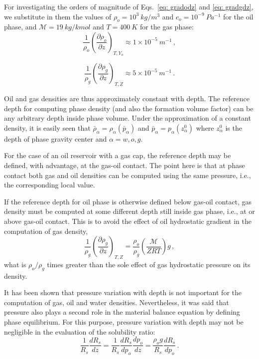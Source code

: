 \documentclass[authoryear,preprint,review,11pt]{elsarticle}
\begin{document}
For investigating the orders of magnitude of Eqs.~\eqref{eq: gradodz} and \eqref{eq: gradgdz}, we substitute in them the values of $\rho_o = 10^3\ kg/m^3$ and $c_o = 10^{-9}\ Pa^{-1}$ for the oil phase, and $\mathcal{M}=19\ kg/kmol$ and $T=400\ K$ for the gas phase: 
\begin{equation}
\frac{1}{\rho_o}\left(\frac{\partial \rho_o}{\partial z}\right)_{T,Y_o} \approx 1\times10^{-5}\ m^{-1} \, ,
\end{equation}

\begin{equation}
\frac{1}{\rho_g}\left(\frac{\partial \rho_g}{\partial z}\right)_{T,Z} \approx 5\times10^{-5}\ m^{-1} \, .
\end{equation}

Oil and gas densities are thus approximately constant with depth.
The reference depth for computing phase density (and also the formation volume factor) can be any arbitrary depth inside phase volume. Under the approximation of a constant density, it is easily seen that $\bar{\rho}_\alpha = \rho_\alpha\left(\bar{p}_\alpha\right)$ and $\bar{p}_\alpha=p_\alpha\left(z^0_\alpha\right)$ where $z^0_\alpha$ is the depth of phase gravity center and $\alpha=w, o, g$.

For the case of an oil reservoir with a gas cap, the reference depth may be defined, with advantage, at the gas-oil contact. The point here is that at phase contact both gas and oil densities can be computed using the same pressure, i.e., the corresponding local value. 

If the reference depth for oil phase is otherwise defined below gas-oil contact, gas density must be computed at some different depth still inside gas phase, i.e., at or above gas-oil contact. This is to avoid the effect of oil hydrostatic gradient in the computation of gas density,
\begin{equation}
\frac{1}{\rho_g}\left(\frac{\partial \rho_g}{\partial z}\right)_{T,Z} = \frac{\rho_o}{\rho_g}\left(\frac{\mathcal{M}}{Z R T}\right)g  \, ,
\end{equation}
what is $\rho_o / \rho_g$ times greater than the sole effect of gas hydrostatic pressure on its density.

It has been shown that pressure variation with depth is not important for the computation of gas, oil and water densities. Nevertheless, it was said that pressure also plays a second role in the material balance equation by defining phase equilibrium. For this purpose, pressure variation with depth may not be negligible in the evaluation of the solubility ratio: 
\begin{equation}\label{eq: dRsdz1}
\frac{1}{R_s}\frac{d R_s}{dz} = \frac{1}{R_s}\frac{d R_s}{dp_o} \frac{dp_o}{dz} = \frac{\rho_o g}{R_s}\frac{dR_s}{dp_o} \, .
\end{equation}
\end{document}

